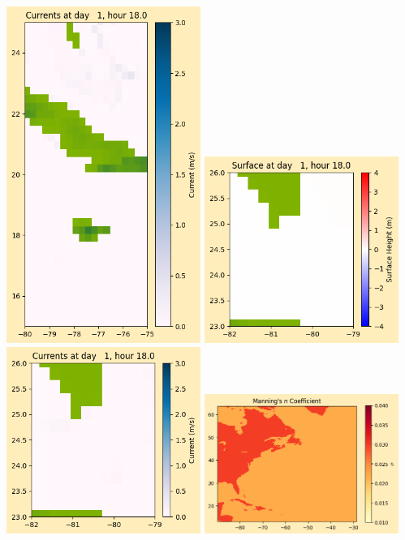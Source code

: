 \documentclass[11pt]{article}
\begin{document}
\includegraphics[width=0.475\textwidth]{frame0019fig1008.png}
\vskip 10pt 
\includegraphics[width=0.475\textwidth]{frame0019fig1009.png}
\includegraphics[width=0.475\textwidth]{frame0019fig1010.png}
\vskip 10pt 
\includegraphics[width=0.475\textwidth]{frame0019fig1011.png}
\end{document}
